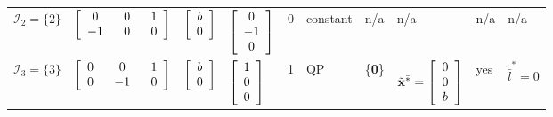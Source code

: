 \documentclass[9pt,twocolumn,twoside,lineno]{pnas-new-1}
\newcommand{\bfx}{{\bf x}}
\newcommand{\bfzero}{{\bf 0}}
\newcommand{\calI}{{\mathcal I}}
\theoremstyle{remark}
\begin{document}
\begin{landscape}
\begin{table}[htbp]
\begin{threeparttable}[htbp]
\begin{tabular}{l l l l l l l l l l}
$\calI_2=\{2\}$ & \hspace{-0.1cm}$\left[ \renewcommand{\arraystretch}{1} \begin{array}{ccc} 0 & ~~0~~ & 1 \\ -1 & ~~0~~ & 0 \end{array}\right]$ & \hspace{-0.3cm}$\left[ \renewcommand{\arraystretch}{1} \begin{array}{c} b\\ 0\end{array}\right]$ & \hspace{-0.2cm}$\left[ \renewcommand{\arraystretch}{1} \begin{array}{c} 0 \\ {-1} \\ 0 \end{array}\right]$ & \hspace{-0.2cm}0 & \hspace{-0.1cm}constant\tnote{a} & \hspace{-0.1cm}n/a & \hspace{-0.1cm}n/a & \hspace{-0.1cm}n/a\tnote{b} & \hspace{-0.1cm}n/a \vspace{0.1cm} \vspace{0.1cm} \\
$\calI_3=\{3\}$ & \hspace{-0.1cm}$\left[ \renewcommand{\arraystretch}{1} \begin{array}{ccc} 0 & ~~0~~ & 1 \\ 0 & ~~{-1}~~ & 0 \end{array}\right]$ & \hspace{-0.3cm}$\left[ \renewcommand{\arraystretch}{1} \begin{array}{c} b\\ 0\end{array}\right]$ & \hspace{-0.2cm}$\left[ \renewcommand{\arraystretch}{1} \begin{array}{c} 1 \\ 0 \\ 0 \end{array}\right]$ & \hspace{-0.2cm}1 & \hspace{-0.1cm}QP & \hspace{-0.1cm}\{\bfzero\} & \hspace{-0.1cm}$\tilde\bfx^{\bar *}=\left[ \renewcommand{\arraystretch}{1} \begin{array}{c} 0 \\ 0 \\ b\end{array}\right]$ & \hspace{-0.1cm}yes & \hspace{-0.1cm}$\tilde{\bar l}^*=0$ \vspace{0.1cm} \vspace{0.1cm} \\

\end{tabular}
\end{threeparttable}
\end{table}
\end{landscape}
\end{document}
